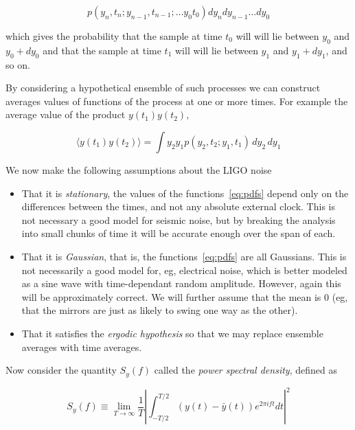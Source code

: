 \begin{equation*}
\label{eq:pdfs}
p(y_n, t_n; y_{n-1}, t_{n-1}; \ldots y_0 t_0) dy_n dy_{n-1} \ldots
dy_0
\end{equation*}

which gives the probability that the sample at time $t_0$ will will
lie between $y_0$ and $y_0 + dy_0$ and that the sample at time $t_1$
will will lie between $y_1$ and $y_1 + dy_1$, and so on.

By considering a hypothetical ensemble of such processes we can 
construct averages values of functions of the process at one or more
times.  For example the average value of the product $y(t_1)y(t_2)$,

\begin{equation*}
\langle y(t_1) y(t_2) \rangle = \int y_2 y_1
p(y_2, t_2; y_1, t_1)\, dy_2\, dy_1
\end{equation*}

We now make the following assumptions about the LIGO noise

\begin{itemize}
\item That it is \emph{stationary}, the values of the
functions~\ref{eq:pdfs} depend only on the differences between the
times, and not any absolute external clock.  This is not necessary a
good model for seismic noise, but by breaking the analysis into small
chunks of time it will be accurate enough over the span of each.

\item That it is \emph{Gaussian}, that is, the functions~\ref{eq:pdfs}
are all Gaussians.  This is not necessarily a good model for, eg,
electrical noise, which is better modeled as a sine wave with
time-dependant random amplitude.  However, again this will be
approximately correct.  We will further assume that the mean is 0
(eg, that the mirrors are just as likely to swing one way as the
other).

\item That it satisfies the \emph{ergodic hypothesis} so that we may
replace ensemble averages with time averages.

\end{itemize}

Now consider the quantity $S_y(f)$ called the \emph{power spectral
density}, defined as

\begin{equation}
\label{psd1}
S_y(f) \equiv \lim_{T \to \infty} 
\frac{1}{T} \left| \int_{-T/2}^{T/2} (y(t) - \bar{y}(t))
e^{2 \pi i f t} dt \right|^2
\end{equation}

